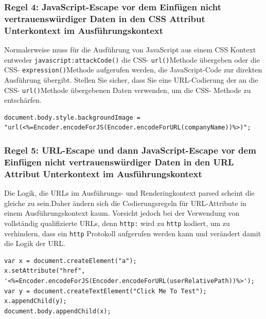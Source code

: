 \subsubsection{Regel 4: JavaScript-Escape vor dem Einfügen nicht vertrauenswürdiger Daten in den CSS Attribut Unterkontext im Ausführungskontext}

Normalerweise muss für die Ausführung von JavaScript aus einem CSS Kontext entweder \verb+javascript:attackCode()+ die CSS- \verb+url()+Methode übergeben oder die CSS- \verb+expression()+Methode aufgerufen werden, die JavaScript-Code zur direkten Ausführung übergibt. Stellen Sie sicher, dass Sie eine URL-Codierung der an die CSS- \verb+url()+Methode übergebenen Daten verwenden, um die CSS- Methode zu entschärfen.



\begin{lstlisting}[numbers=none, caption={Regel 4 - Beispiel JavaScript-Escape vor dem Einfügen in den CSS Attribut Unterkontext}, label=Beispiel JavaScript-Escape im CSS Attribut Unterkontext]
document.body.style.backgroundImage = "url(<%=Encoder.encodeForJS(Encoder.encodeForURL(companyName))%>)";
\end{lstlisting}

\subsubsection{Regel 5: URL-Escape und dann JavaScript-Escape vor dem Einfügen nicht vertrauenswürdiger Daten in den URL Attribut Unterkontext im Ausführungskontext}

Die Logik, die URLs im Ausführungs- und Renderingkontext parsed scheint die gleiche zu sein.Daher ändern sich die Codierungsregeln für URL-Attribute in einem Ausführungskontext kaum.
Vorsicht jedoch bei der Verwendung von vollständig qualifizierte URLs, denn \verb+http:+ wird zu \verb+http+ kodiert, um zu verhindern, dass ein \verb+http+ Protokoll aufgerufen werden kann und verändert damit die Logik der URL.

\begin{lstlisting}[numbers=none, caption={Regel 5 - Beispiel URL-Escape vor dem Einfügen in den URL Attribut Unterkontext}, label=Beispiel URL-Escape im URL Attribut Unterkontext]
var x = document.createElement("a");
x.setAttribute("href", '<%=Encoder.encodeForJS(Encoder.encodeForURL(userRelativePath))%>');
var y = document.createTextElement("Click Me To Test");
x.appendChild(y);
document.body.appendChild(x);
\end{lstlisting}



